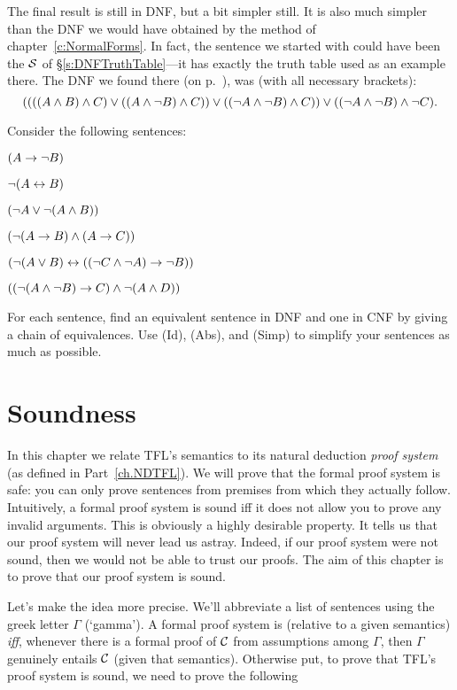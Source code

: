 The final result is still in DNF, but a bit simpler still.  It is also much simpler than the DNF we would have obtained by the method of chapter~\ref{c:NormalForms}. In fact, the sentence we started with could have been the $\mathcal{S}$ of \S\ref{s:DNFTruthTable}---it has exactly the truth table used as an example there. The DNF we found there (on p.~\pageref{longDNF}), was (with all necessary brackets):
$$((((A \wedge B) \wedge C) \vee ((A \wedge \neg B) \wedge C)) \vee ((\neg A \wedge \neg B) \wedge C)) \vee ((\neg A \wedge \neg B) \wedge \neg C).$$

\practiceproblems
\problempart
\label{pr.DNF2}
Consider the following sentences:
\begin{earg}
	\item $(A \rightarrow \neg B)$
	\item $\neg (A \leftrightarrow B)$
	\item $(\neg A \vee \neg (A \wedge B))$
	\item $(\neg (A \rightarrow B ) \wedge (A \rightarrow C))$
	\item $(\neg (A \vee B) \leftrightarrow ((\neg C \wedge \neg A) \rightarrow \neg B))$
	\item $((\neg (A \wedge \neg B) \rightarrow C) \wedge \neg (A \wedge D))$
\end{earg}
For each sentence, find an equivalent sentence in DNF and one in CNF by giving a chain of equivalences. Use (Id), (Abs), and (Simp) to simplify your sentences as much as possible.

\chapter{Soundness}\label{ch:Soundness}

In this chapter we relate TFL's semantics to its natural deduction \emph{proof system} (as defined in Part~\ref{ch.NDTFL}). We will prove that the formal proof system is safe: you can only prove sentences from premises from which they actually follow.
Intuitively, a formal proof system is sound iff it does not allow you to prove any invalid arguments. This is obviously a highly desirable property. It tells us that our proof system will never lead us astray. Indeed, if our proof system were not sound, then we would not be able to trust our proofs. The aim of this chapter is to prove that our proof system is sound.

Let's make the idea more precise. We'll abbreviate a list of sentences using the greek letter $\Gamma$ (`gamma'). A formal proof system is  (relative to a given semantics) \emph{iff}, whenever there is a formal proof of $\mathcal{C}$ from assumptions among $\Gamma$, then $\Gamma$ genuinely entails $\mathcal{C}$ (given that semantics). Otherwise put, to prove that TFL's proof system is sound, we need to prove the following

